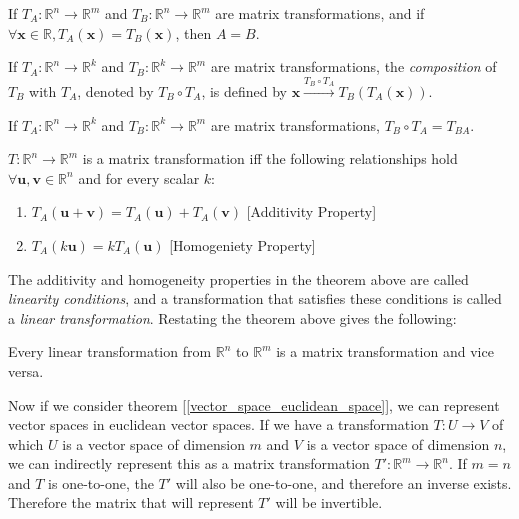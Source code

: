 \documentclass{report}
\begin{document}
		\begin{thm}
			If $T_A:\mathbb{R}^n \rightarrow \mathbb{R}^m$ and $T_B:\mathbb{R}^n \rightarrow \mathbb{R}^m$ are matrix transformations, and if $\forall \bm{x} \in \mathbb{R}, T_A(\bm{x})=T_B(\bm{x})$, then $A=B$.
		\end{thm}
		
		\begin{defn}
			If $T_A:\mathbb{R}^n \rightarrow \mathbb{R}^k$ and $T_B:\mathbb{R}^k \rightarrow \mathbb{R}^m$ are matrix transformations, the \emph{composition} of $T_B$ with $T_A$, denoted by $T_B \circ T_A$, is defined by $\bm{x} \xrightarrow{T_B \circ T_A} T_B(T_A(\bm{x}))$.
		\end{defn}
		
		\begin{thm}
			If $T_A:\mathbb{R}^n \rightarrow \mathbb{R}^k$ and $T_B:\mathbb{R}^k \rightarrow \mathbb{R}^m$ are matrix transformations, $T_B \circ T_A=T_{BA}$.
		\end{thm}
		
		\begin{thm}
			$T:\mathbb{R}^n\rightarrow\mathbb{R}^m$ is a matrix transformation iff the following relationships hold $\forall \bm{u}, \bm{v} \in \mathbb{R}^n$ and for every scalar $k$:
			\begin{enumerate}
				\item $T_A(\bm{u}+\bm{v})=T_A(\bm{u})+T_A(\bm{v})$ [Additivity Property]
				\item $T_A(k\bm{u})=kT_A(\bm{u})$ [Homogeniety Property]
			\end{enumerate}
		\end{thm}
		
		The additivity and homogeneity properties in the theorem above are called \emph{linearity conditions}, and a transformation that satisfies these conditions is called a \emph{linear transformation}. Restating the theorem above gives the following:
		
		\begin{thm}
			Every linear transformation from $\mathbb{R}^n$ to $\mathbb{R}^m$ is a matrix transformation and vice versa.
		\end{thm}
		
		Now if we consider theorem [\ref{vector_space_euclidean_space}], we can represent vector spaces in euclidean vector spaces. If we have a transformation $T:U \rightarrow V$ of which $U$ is a vector space of dimension $m$ and $V$ is a vector space of dimension $n$, we can indirectly represent this as a matrix transformation $T':\mathbb{R}^m \rightarrow \mathbb{R}^n$. If $m=n$ and $T$ is one-to-one, the $T'$ will also be one-to-one, and therefore an inverse exists. Therefore the matrix that will represent $T'$ will be invertible.
	
\end{document}
